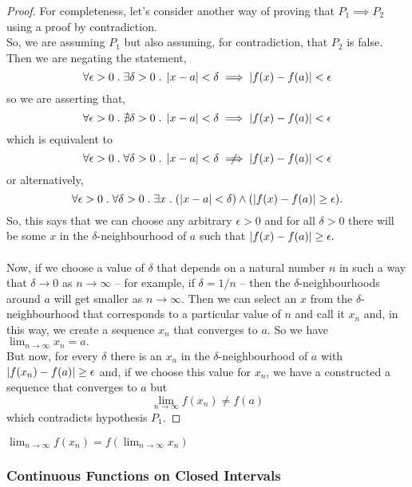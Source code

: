 \documentclass[MathsNotesBase.tex]{subfiles}
\begin{document}
{\begin{proof}
			For completeness, let's consider another way of proving that ${ P_1 \implies P_2 }$ using a proof by contradiction.\\
			So, we are assuming $P_1$ but also assuming, for contradiction, that $P_2$ is false. Then we are negating the statement,
			\[ \forall \epsilon > 0 \;.\; \exists \delta > 0 \;.\; \left\lvert x - a\right\rvert < \delta \implies \left\lvert f(x) - f(a)\right\rvert < \epsilon \]
			so we are asserting that,
			\[ \forall \epsilon > 0 \;.\; \nexists \delta > 0 \;.\; \left\lvert x - a\right\rvert < \delta \implies \left\lvert f(x) - f(a)\right\rvert < \epsilon \]
			which is equivalent to
			\[ \forall \epsilon > 0 \logicsep \forall \delta > 0 \logicsep \abs{x - a} < \delta \centernot\implies \abs{f(x) - f(a)} < \epsilon \]
			or alternatively,
			\[ \forall \epsilon > 0 \;.\; \forall \delta > 0 \;.\; \exists x \;.\; (\left\lvert x - a\right\rvert < \delta) \wedge (\left\lvert f(x) - f(a)\right\rvert \geq \epsilon). \]
			So, this says that we can choose any arbitrary ${ \epsilon > 0 }$ and for all ${ \delta > 0 }$ there will be some $x$ in the $\delta$-neighbourhood of $a$ such that ${ \left\lvert f(x) - f(a)\right\rvert \geq \epsilon. }$\\\\
			Now, if we choose a value of $\delta$ that depends on a natural number $n$ in such a way that ${ \delta \to 0 }$ as ${ n \to \infty }$ -- for example, if ${ \delta = 1/n }$ -- then the $\delta$-neighbourhoods around $a$ will get smaller as ${ n \to \infty. }$ Then we can select an $x$ from the $\delta$-neighbourhood that corresponds to a particular value of $n$ and call it $x_n$ and, in this way, we create a sequence $x_n$ that converges to $a$. So we have ${ \lim_{n \to \infty} x_n = a. }$\\
			But now, for every $\delta$ there is an $x_n$ in the $\delta$-neighbourhood of $a$ with ${ \left\lvert f(x_n) - f(a)\right\rvert \geq \epsilon }$ and, if we choose this value for $x_n$, we have a constructed a sequence that converges to $a$ but
			\[ \lim_{n \to \infty} f(x_n) \neq f(a) \]
			which contradicts hypothesis $P_1$.
		\end{proof}
		\begin{corollary}
			\label{cor:lim_of_func_of_convergent_sequence_is_func_of_limit}
			${ \lim_{n \to \infty} f(x_n) = f(\lim_{n \to \infty} x_n) }$
		\end{corollary}
	
		\bigskip
		\subsubsection{Continuous Functions on Closed Intervals}
		
}
\end{document}

